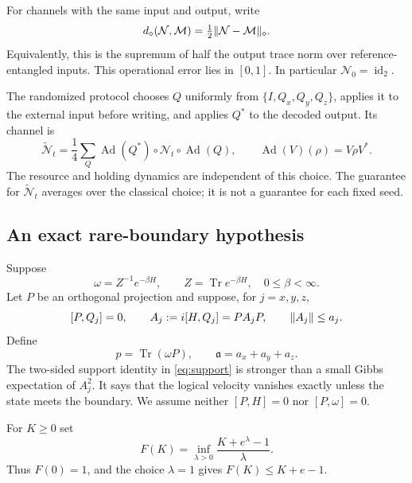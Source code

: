 \documentclass[11pt,reqno]{amsart}
\numberwithin{equation}{section}
\theoremstyle{definition}
\theoremstyle{remark}
\newcommand{\Tr}{\operatorname{Tr}}
\newcommand{\id}{\operatorname{id}}
\newcommand{\Ad}{\operatorname{Ad}}
\newcommand{\Ncal}{\mathcal N}
\newcommand{\diam}{d_\diamond}
\newcommand{\pa}{\mathfrak a}
\DeclarePairedDelimiter{\norm}{\lVert}{\rVert}
\begin{document}
For channels with the same input and output, write
\[
 \diam(\Ncal,\mathcal M)=\tfrac12\norm{\Ncal-\mathcal M}_\diamond.
\]
Equivalently, this is the supremum of half the output trace norm over
reference-entangled inputs. This operational error lies in \([0,1]\).
In particular \(\Ncal_0=\id_2\).

The randomized protocol chooses \(Q\) uniformly from
\(\{I,Q_x,Q_y,Q_z\}\), applies it to the external input before writing,
and applies \(Q^*\) to the decoded output. Its channel is
\begin{equation}\label{eq:twirl}
 \widetilde{\Ncal}_t=
 \frac14\sum_Q\Ad(Q^*)\circ\Ncal_t\circ\Ad(Q),
 \qquad \Ad(V)(\rho)=V\rho V^*.
\end{equation}
The resource and holding dynamics are independent of this choice.
The guarantee for \(\widetilde{\Ncal}_t\) averages over the classical choice;
it is not a guarantee for each fixed seed.

\subsection{An exact rare-boundary hypothesis}

Suppose
\begin{equation}\label{eq:gibbs}
          \omega=Z^{-1}e^{-\beta H},
          \qquad Z=\Tr e^{-\beta H},\quad 0\le\beta<\infty.
\end{equation}
Let \(P\) be an orthogonal projection and suppose, for \(j=x,y,z\),
\begin{equation}\label{eq:support}
 [P,Q_j]=0,\qquad
 A_j:=i[H,Q_j]=P A_jP,\qquad
 \norm{A_j}\le a_j .
\end{equation}
Define
\begin{equation}\label{eq:parameters}
           p=\Tr(\omega P),\qquad \pa=a_x+a_y+a_z.
\end{equation}
The two-sided support identity in \eqref{eq:support} is stronger than
a small Gibbs expectation of \(A_j^2\). It says that the logical
velocity vanishes exactly unless the state meets the boundary.
We assume neither \([P,H]=0\) nor \([P,\omega]=0\).

For \(K\ge0\) set
\begin{equation}\label{eq:F}
 F(K)=\inf_{\lambda>0}\frac{K+e^\lambda-1}{\lambda}.
\end{equation}
Thus \(F(0)=1\), and the choice \(\lambda=1\) gives
\(F(K)\le K+e-1\).
\end{document}
